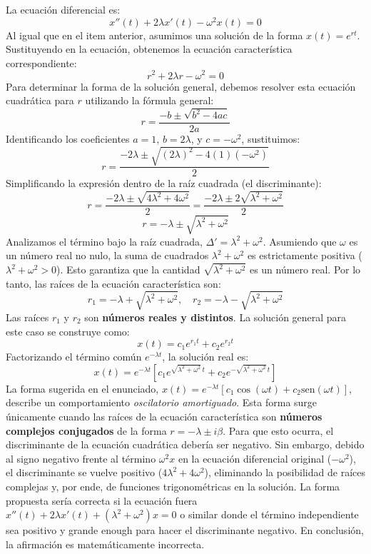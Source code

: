 \documentclass[a4paper]{article}
\begin{document}
La ecuación diferencial es:
$$
x''(t) + 2\lambda x'(t) - \omega^2 x(t) = 0
$$
Al igual que en el item anterior, asumimos una solución de la forma $x(t) = e^{rt}$. Sustituyendo en la ecuación, obtenemos la ecuación característica correspondiente:
$$
r^2 + 2\lambda r - \omega^2 = 0
$$
Para determinar la forma de la solución general, debemos resolver esta ecuación cuadrática para $r$ utilizando la fórmula general:
$$
r = \frac{-b \pm \sqrt{b^2 - 4ac}}{2a}
$$
Identificando los coeficientes $a = 1$, $b = 2\lambda$, y $c = -\omega^2$, sustituimos:
$$
r = \frac{-2\lambda \pm \sqrt{(2\lambda)^2 - 4(1)(-\omega^2)}}{2}
$$
Simplificando la expresión dentro de la raíz cuadrada (el discriminante):
$$
r = \frac{-2\lambda \pm \sqrt{4\lambda^2 + 4\omega^2}}{2} = \frac{-2\lambda \pm 2\sqrt{\lambda^2 + \omega^2}}{2}
$$
$$
r = -\lambda \pm \sqrt{\lambda^2 + \omega^2}
$$
Analizamos el término bajo la raíz cuadrada, $\Delta' = \lambda^2 + \omega^2$. Asumiendo que $\omega$ es un número real no nulo, la suma de cuadrados $\lambda^2 + \omega^2$ es estrictamente positiva ($\lambda^2 + \omega^2 > 0$). Esto garantiza que la cantidad $\sqrt{\lambda^2 + \omega^2}$ es un número real. Por lo tanto, las raíces de la ecuación característica son:
$$
r_1 = -\lambda + \sqrt{\lambda^2 + \omega^2}, \quad r_2 = -\lambda - \sqrt{\lambda^2 + \omega^2}
$$
Las raíces $r_1$ y $r_2$ son \textbf{números reales y distintos}. La solución general para este caso se construye como:
$$
x(t) = c_1 e^{r_1 t} + c_2 e^{r_2 t}
$$
Factorizando el término común $e^{-\lambda t}$, la solución real es:
$$
x(t) = e^{-\lambda t} \left[ c_1 e^{\sqrt{\lambda^2 + \omega^2} \, t} + c_2 e^{-\sqrt{\lambda^2 + \omega^2} \, t} \right]
$$
La forma sugerida en el enunciado, $x(t)= e^{-\lambda t}[c_1 \cos(\omega t)+ c_2 \text{sen}(\omega t)]$, describe un comportamiento \textit{oscilatorio amortiguado}. Esta forma surge únicamente cuando las raíces de la ecuación característica son \textbf{números complejos conjugados} de la forma $r = -\lambda \pm i\beta$. Para que esto ocurra, el discriminante de la ecuación cuadrática debería ser negativo. Sin embargo, debido al signo negativo frente al término $\omega^2 x$ en la ecuación diferencial original ($-\omega^2$), el discriminante se vuelve positivo ($4\lambda^2 + 4\omega^2$), eliminando la posibilidad de raíces complejas y, por ende, de funciones trigonométricas en la solución. La forma propuesta sería correcta si la ecuación fuera $x''(t) + 2\lambda x'(t) + (\lambda^2 + \omega^2)x = 0$ o similar donde el término independiente sea positivo y grande enough para hacer el discriminante negativo. En conclusión, la afirmación es matemáticamente incorrecta.
\end{document}
